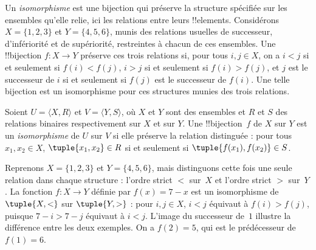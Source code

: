\documentclass[../../../include/open-logic-section]{subfiles}
\begin{document}

\begin{explain}
Un \emph{isomorphisme} est une bijection qui
préserve la structure spécifiée sur les ensembles
qu'elle relie, ici les relations entre leurs
!!{element}s. Considérons
$X=\{1,2,3\}$ et $Y=\{4,5,6\}$,
munis des relations usuelles de successeur,
d'infériorité et de supériorité, restreintes
à chacun de ces ensembles. Une !!{bijection}
$f\colon X\to Y$ préserve ces trois relations
si, pour tous $i,j\in X$, on a
$i<j$ si et seulement si $f(i)<f(j)$,
$i>j$ si et seulement si $f(i)>f(j)$,
et $j$ est le successeur de $i$ si et seulement
si $f(j)$ est le successeur de $f(i)$.
Une telle bijection est un isomorphisme
pour ces structures munies des trois relations.
\end{explain}

\begin{defn}[Isomorphisme]
Soient $U=\langle X,R\rangle$ et
$V=\langle Y,S\rangle$, où $X$ et $Y$
sont des ensembles et $R$ et $S$ des
relations binaires respectivement sur $X$ et
sur $Y$. Une !!{bijection}~$f$ de $X$
sur $Y$ est un \emph{isomorphisme} de $U$
sur $V$ si elle préserve la relation
distinguée : pour tous $x_1,x_2\in X$,
$\tuple{x_1,x_2}\in R$ si et seulement si
$\tuple{f(x_1),f(x_2)}\in S$.
\end{defn}

\begin{ex}
Reprenons $X=\{1,2,3\}$ et
$Y=\{4,5,6\}$, mais distinguons
cette fois une seule relation dans chaque
structure : l'ordre strict $<$ sur~$X$
et l'ordre strict $>$ sur~$Y$.
La fonction $f\colon X\to Y$ définie
par $f(x)=7-x$ est un isomorphisme
de $\tuple{X,<}$ sur $\tuple{Y,>}$ :
pour $i,j\in X$, $i<j$ équivaut à
$f(i)>f(j)$, puisque $7-i>7-j$ équivaut à $i<j$.
L'image du successeur de~$1$ illustre la différence
entre les deux exemples. On a $f(2)=5$, qui est
le prédécesseur de~$f(1)=6$.
\end{ex}
\end{document}
